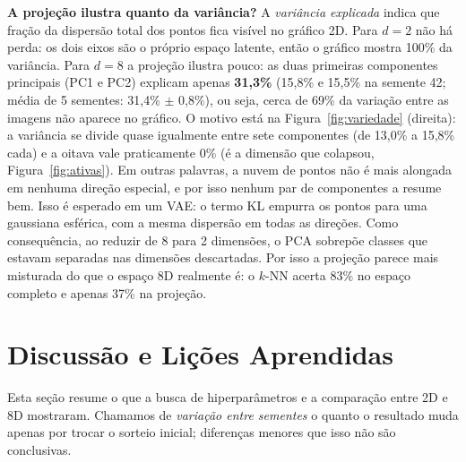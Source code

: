 \documentclass[11pt,a4paper]{article}
\begin{document}
\textbf{A projeção ilustra quanto da variância?} A \emph{variância explicada} indica que fração da dispersão total dos pontos fica visível no gráfico 2D. Para $d=2$ não há perda: os dois eixos são o próprio espaço latente, então o gráfico mostra 100\% da variância. Para $d=8$ a projeção ilustra pouco: as duas primeiras componentes principais (PC1 e PC2) explicam apenas \textbf{31,3\%} (15,8\% e 15,5\% na semente 42; média de 5 sementes: 31,4\% $\pm$ 0,8\%), ou seja, cerca de 69\% da variação entre as imagens não aparece no gráfico. O motivo está na Figura~\ref{fig:variedade} (direita): a variância se divide quase igualmente entre sete componentes (de 13,0\% a 15,8\% cada) e a oitava vale praticamente 0\% (é a dimensão que colapsou, Figura~\ref{fig:ativas}). Em outras palavras, a nuvem de pontos não é mais alongada em nenhuma direção especial, e por isso nenhum par de componentes a resume bem. Isso é esperado em um VAE: o termo KL empurra os pontos para uma gaussiana esférica, com a mesma dispersão em todas as direções. Como consequência, ao reduzir de 8 para 2 dimensões, o PCA sobrepõe classes que estavam separadas nas dimensões descartadas. Por isso a projeção parece mais misturada do que o espaço 8D realmente é: o $k$-NN acerta 83\% no espaço completo e apenas 37\% na projeção.

\section{Discussão e Lições Aprendidas}
\label{sec:discussao}
Esta seção resume o que a busca de hiperparâmetros e a comparação entre 2D e 8D mostraram. Chamamos de \emph{variação entre sementes} o quanto o resultado muda apenas por trocar o sorteio inicial; diferenças menores que isso não são conclusivas.
\end{document}
